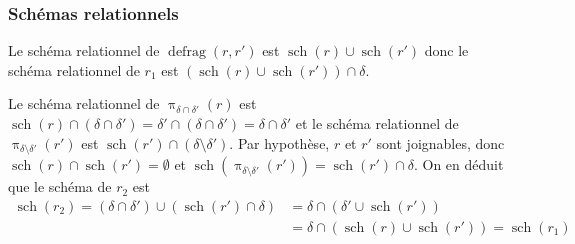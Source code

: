 \documentclass[french]{article}
\DeclareMathOperator{\proj}{\pi}
\DeclareMathOperator{\defrag}{defrag}
\DeclareMathOperator{\s}{sch}
\begin{document}
\subsubsection*{Schémas relationnels}
Le schéma relationnel de $\defrag(r, r')$ est $\s(r) \cup \s(r')$
donc le schéma relationnel de $r_1$ est $(\s(r) \cup \s(r')) \cap \delta$.

Le schéma relationnel de $\proj_{\delta \cap \delta'}(r)$ est
$\s(r) \cap (\delta \cap \delta') = \delta' \cap (\delta \cap \delta') = \delta \cap \delta'$
et le schéma relationnel de $\proj_{\delta \setminus \delta'}(r')$
est $\s(r') \cap (\delta \setminus \delta')$.
Par hypothèse, $r$ et $r'$ sont joignables,
donc $\s(r) \cap \s(r') = \emptyset$
et $\s(\proj_{\delta \setminus \delta'}(r'))
= \s(r')  \cap \delta$.
On en déduit que le schéma de $r_2$ est
\begin{align*}
\s(r_2) = (\delta \cap \delta') \cup (\s(r')  \cap \delta) 
& = \delta \cap (\delta' \cup \s(r'))  \\
 & = \delta \cap (\s(r) \cup \s(r'))  = \s(r_1)
\end{align*}
\end{document}
